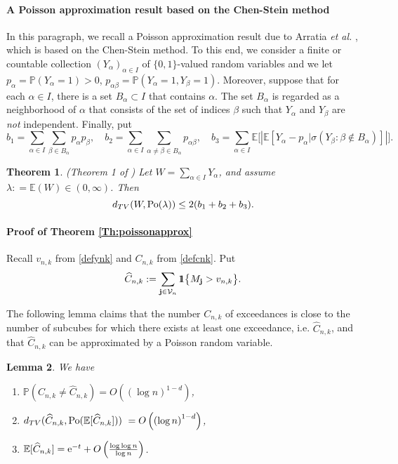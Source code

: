 \documentclass{article}
\theoremstyle{thm}
\newtheorem{theorem}{Theorem}[section]
\newtheorem{lemma}[theorem]{Lemma}
\theoremstyle{definition}
\theoremstyle{definition}
\theoremstyle{def}
\newcommand{\E}{\mathbb{E}} %
\newcommand{\PP}{\mathbb{P}} %
\newcommand{\jj}{\mathbf{j}}
\newcommand{\VV}{\mathcal{V}_n}
\newcommand{\ind}{1\hspace{-0,9ex}1}
\begin{document}
\paragraph{ A Poisson approximation result based on the Chen-Stein method}
In this paragraph, we recall a Poisson approximation result due to Arratia \textit{et al.} \cite{AGG}, which is based on the Chen-Stein method.
To this end, we consider a finite or countable collection $(Y_\alpha)_{\alpha\in I}$ of $\{0,1\}$-valued random variables and we let $p_\alpha = \PP(Y_\alpha=1)>0$, $p_{\alpha\beta}=\PP(Y_\alpha=1, Y_\beta=1)$. Moreover, suppose that
for each $\alpha\in I$, there is a set $B_\alpha\subset I$ that contains $\alpha$. The set $B_\alpha$ is regarded as a neighborhood
of $\alpha$ that consists of the set of indices $\beta$ such that $Y_\alpha$ and $Y_\beta$ are \textit{not} independent. Finally, put
\begin{equation}
\label{eq:defb}
b_1=\sum_{\alpha\in I} \sum_{\beta \in B_\alpha}p_\alpha p_\beta, \quad b_2=\sum_{\alpha\in I}\sum_{\alpha\neq \beta \in B_\alpha}p_{\alpha\beta},
\quad b_3=\sum_{\alpha\in I}\E \big[\left| \E[ Y_\alpha-p_\alpha|\sigma(Y_\beta: \beta\not\in B_\alpha)]  \right| \big] .
\end{equation}


\begin{theorem} {\rm (}Theorem 1 of \cite{AGG} {\rm )}
\label{Th:AGG}
Let $W=\sum_{\alpha \in I}Y_\alpha$, and assume $\lambda: =\E(W) \in (0,\infty)$. Then
\[
d_{TV}(W, {{\rm{Po}}}(\lambda)) \leq 2(b_1+b_2+b_3).
\]
\end{theorem}




\paragraph{Proof of Theorem \ref{Th:poissonapprox}}
Recall $v_{n,k}$ from \eqref{defynk} and $C_{n,k}$ from \eqref{defcnk}.  Put
\[
\widehat{C}_{n,k} := \sum_{\jj\in \VV} \ind \big\{ M_\jj>v_{n,k} \big\}.
\]

The following lemma claims that the number {$C_{n,k}$} of exceedances  is close to the number of subcubes for which there exists at least one exceedance, i.e. $\widehat{C}_{n,k}$, and that $\widehat{C}_{n,k}$ can be approximated by a Poisson random variable.


\begin{lemma} \label{Le:mainlemma} We have
\begin{enumerate}
\item[{{\rm a)}}] $\PP (C_{n,k} \neq \widehat{C}_{n,k} ) =  O\left(\left(\log n\right)^{1-d}   \right)$,
\item[{{\rm b)}}] $d_{TV}(\widehat{C}_{n,k}, {{\rm{Po}}}(\E[\widehat{C}_{n,k}]))\ =  O\left(\left(\log n\right)^{1-d}   \right)$,
\item[{{\rm c)}}]  $\E [ \widehat{C}_{n,k}] = {\rm e}^{-t} +   O\left( \frac{\log\log n}{\log n}  \right)$.
\end{enumerate}
\end{lemma}
\end{document}

